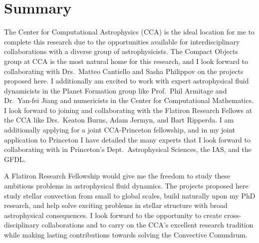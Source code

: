 \documentclass[onecolumn, hmargin=1in, vmargin=1in]{aastex62}
\begin{document}
\section*{\textbf{Summary}}
The Center for Computational Astrophysics (CCA) is the ideal location for me to complete this research due to the opportunities available for interdisciplinary collaborations with a diverse group of astrophysicists.
The Compact Objects group at CCA is the most natural home for this research, and I look forward to collaborating with Drs.~Matteo Cantiello and Sasha Philippov on the projects proposed here.
I additionally am excited to work with expert astrophysical fluid dynamicists in the Planet Formation group like Prof.~Phil Armitage and Dr.~Yan-fei Jiang and numericists in the Center for Computational Mathematics.
I look forward to joining and collaborating with the Flatiron Research Fellows at the CCA like Drs.~Keaton Burns, Adam Jermyn, and Bart Ripperda.
I am additionally applying for a joint CCA-Princeton fellowship, and in my joint application to Princeton I have detailed the many experts that I look forward to collaborating with in Princeton's Dept.~Astrophysical Sciences, the IAS, and the GFDL.

A Flatiron Research Fellowship would give me the freedom to study these ambitious problems in astrophysical fluid dynamics.
The projects proposed here study stellar convection from small to global scales, build naturally upon my PhD research, and help solve exciting problems in stellar structure with broad astrophysical consequences.
I look forward to the opportunity to create cross-disciplinary collaborations and to carry on the CCA's excellent research tradition while making lasting contributions towards solving the Convective Conundrum.

\vspace{-11pt}


\end{document}
